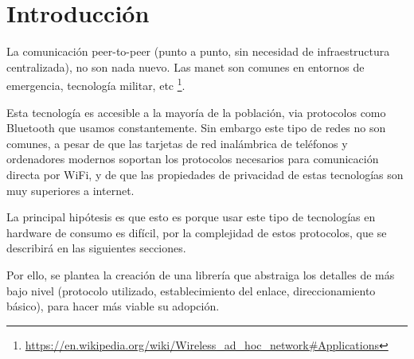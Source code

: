 \chapter{Introducción}

La comunicación peer-to-peer (punto a punto, sin necesidad de infraestructura
centralizada), no son nada nuevo. Las \gls{manet} son comunes en entornos de
emergencia, tecnología militar, etc \footnote{\url{https://en.wikipedia.org/wiki/Wireless_ad_hoc_network\#Applications}}.

Esta tecnología es accesible a la mayoría de la población, via protocolos como
Bluetooth que usamos constantemente. Sin embargo este tipo de redes no son
comunes, a pesar de que las tarjetas de red inalámbrica de teléfonos y
ordenadores modernos soportan los protocolos necesarios para comunicación
directa por WiFi, y de que las propiedades de privacidad de estas tecnologías
son muy superiores a internet.

La principal hipótesis es que esto es porque usar este tipo de tecnologías en
hardware de consumo es difícil, por la complejidad de estos protocolos, que se
describirá en las siguientes secciones.

Por ello, se plantea la creación de una librería que abstraiga los detalles de
más bajo nivel (protocolo utilizado, establecimiento del enlace,
direccionamiento básico), para hacer más viable su adopción.
